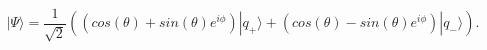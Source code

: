 \begin{equation}
\label{statePsi}
|\Psi \rangle=
\frac{1}{\sqrt{2}}\left((cos(\theta)+sin(\theta)e^{i\phi})|q_+
\rangle+(cos(\theta)-sin(\theta)e^{i\phi})|q_- \rangle
\right).
\end{equation}

